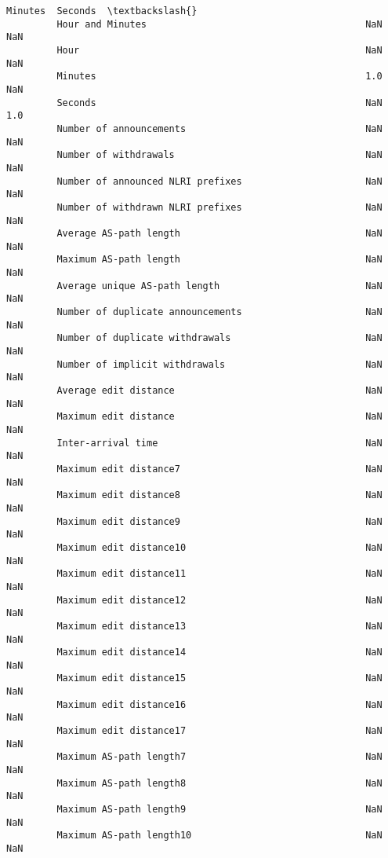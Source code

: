 \documentclass[11pt]{article}
\begin{document}
\begin{Verbatim}[commandchars=\\\{\}]
                                                            Minutes  Seconds  \textbackslash{}
         Hour and Minutes                                       NaN      NaN   
         Hour                                                   NaN      NaN   
         Minutes                                                1.0      NaN   
         Seconds                                                NaN      1.0   
         Number of announcements                                NaN      NaN   
         Number of withdrawals                                  NaN      NaN   
         Number of announced NLRI prefixes                      NaN      NaN   
         Number of withdrawn NLRI prefixes                      NaN      NaN   
         Average AS-path length                                 NaN      NaN   
         Maximum AS-path length                                 NaN      NaN   
         Average unique AS-path length                          NaN      NaN   
         Number of duplicate announcements                      NaN      NaN   
         Number of duplicate withdrawals                        NaN      NaN   
         Number of implicit withdrawals                         NaN      NaN   
         Average edit distance                                  NaN      NaN   
         Maximum edit distance                                  NaN      NaN   
         Inter-arrival time                                     NaN      NaN   
         Maximum edit distance7                                 NaN      NaN   
         Maximum edit distance8                                 NaN      NaN   
         Maximum edit distance9                                 NaN      NaN   
         Maximum edit distance10                                NaN      NaN   
         Maximum edit distance11                                NaN      NaN   
         Maximum edit distance12                                NaN      NaN   
         Maximum edit distance13                                NaN      NaN   
         Maximum edit distance14                                NaN      NaN   
         Maximum edit distance15                                NaN      NaN   
         Maximum edit distance16                                NaN      NaN   
         Maximum edit distance17                                NaN      NaN   
         Maximum AS-path length7                                NaN      NaN   
         Maximum AS-path length8                                NaN      NaN   
         Maximum AS-path length9                                NaN      NaN   
         Maximum AS-path length10                               NaN      NaN   

\end{Verbatim}
\end{document}
